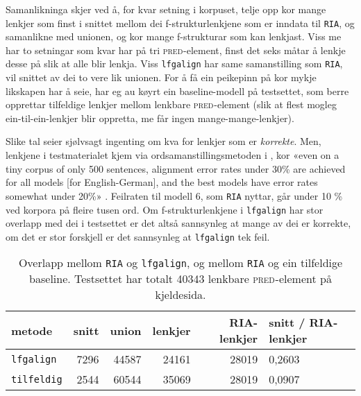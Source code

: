 \documentclass[11pt,a4paper,oneside,draft]{book}
\newcommand{\F}[2]{\textsc{#1}\ensuremath{_{#2}}}
\newcommand{\PRED}{\F{pred}{}}
\begin{document}
Samanlikninga skjer ved å, for kvar setning i korpuset, telje opp kor
mange lenkjer som finst i snittet mellom dei f-strukturlenkjene som er
inndata til \texttt{RIA}, og samanlikne med unionen, og kor mange
f-strukturar som kan lenkjast. Viss me har to setningar som kvar har
på tri \PRED{}-element, finst det seks måtar å lenkje desse på slik at
alle blir lenkja. Viss \texttt{lfgalign} har same samanstilling som \texttt{RIA},
vil snittet av dei to vere lik unionen. For å få ein peikepinn på kor
mykje likskapen har å seie, har eg au køyrt ein baseline-modell på
testsettet, som berre opprettar tilfeldige lenkjer mellom lenkbare
\PRED{}-element (slik at flest mogleg ein-til-ein-lenkjer blir
oppretta, me får ingen mange-mange-lenkjer).

 Slike tal seier sjølvsagt ingenting om kva for lenkjer som er
 \emph{korrekte}. Men, lenkjene i testmaterialet kjem via
 ordsamanstillingsmetoden i \citet{och2003scv}, kor «even on a tiny
 corpus of only 500 sentences, alignment error rates under 30\% are
 achieved for all models [for English-German], and the best models
 have error rates somewhat under 20\%»
 \citep[s.~36]{och2003scv}. Feilraten til modell 6, som \texttt{RIA} nyttar,
 går under 10 \% ved korpora på fleire tusen ord. Om f-strukturlenkjene
 i \texttt{lfgalign} har stor overlapp med dei i testsettet er det altså
 sannsynleg at mange av dei er korrekte, om det er stor forskjell er
 det sannsynleg at \texttt{lfgalign} tek feil.


\begin{table}[htb]
\caption{\label{tbl:RIA}Overlapp mellom \texttt{RIA} og \texttt{lfgalign}, og mellom \texttt{RIA} og ein tilfeldige baseline. Testsettet har totalt 40343 lenkbare \PRED{}-element på kjeldesida.}
\begin{center}
\begin{tabular}{lrrrrl}
 metode              &  snitt  &  union  &  lenkjer  &  RIA-lenkjer  &  snitt / RIA-lenkjer  \\
\hline
 \texttt{lfgalign}   &   7296  &  44587  &    24161  &        28019  &  0,2603               \\
 \texttt{tilfeldig}  &   2544  &  60544  &    35069  &        28019  &  0,0907               \\
\end{tabular}
\end{center}
\end{table}
\end{document}
